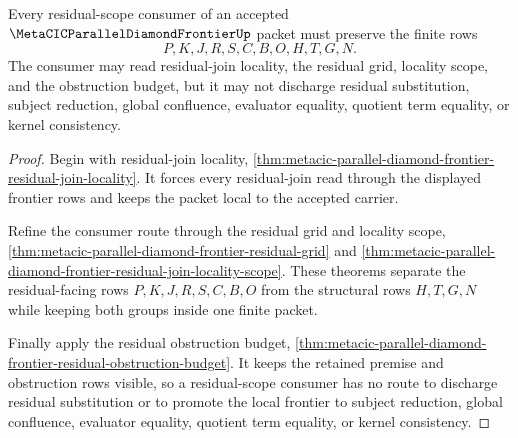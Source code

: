 \begin{theorem}
\label{thm:metacic-parallel-diamond-frontier-residual-scope}
Every residual-scope consumer of an accepted $\MetaCICParallelDiamondFrontierUp$ packet must preserve the finite rows
$$
P,K,J,R,S,C,B,O,H,T,G,N .
$$
The consumer may read residual-join locality, the residual grid, locality scope, and the obstruction budget, but it may not discharge residual substitution, subject reduction, global confluence, evaluator equality, quotient term equality, or kernel consistency.
\end{theorem}
\begin{proof}
Begin with residual-join locality, \autoref{thm:metacic-parallel-diamond-frontier-residual-join-locality}. It forces every residual-join read through the displayed frontier rows and keeps the packet local to the accepted carrier.

Refine the consumer route through the residual grid and locality scope, \autoref{thm:metacic-parallel-diamond-frontier-residual-grid} and \autoref{thm:metacic-parallel-diamond-frontier-residual-join-locality-scope}. These theorems separate the residual-facing rows $P,K,J,R,S,C,B,O$ from the structural rows $H,T,G,N$ while keeping both groups inside one finite packet.

Finally apply the residual obstruction budget, \autoref{thm:metacic-parallel-diamond-frontier-residual-obstruction-budget}. It keeps the retained premise and obstruction rows visible, so a residual-scope consumer has no route to discharge residual substitution or to promote the local frontier to subject reduction, global confluence, evaluator equality, quotient term equality, or kernel consistency.
\end{proof}
